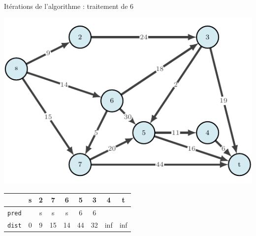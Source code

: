\begin{frame}{Itérations de l'algorithme : traitement de $6$}
    \begin{center}
        \includegraphics[height=.6\textheight]{fig/dijkstra-0.pdf}      
    \begin{tabular}{c|cccccccc}
      
        & \textbf{s}   &\textbf{2}     &7      &\textbf{6}     &5      &3      &4      &t      \\
        \hline
        \texttt{pred} & &s      &s      &s      &6      &6      &       &       \\
        \texttt{dist} & 0       &9      &15     &14     &44     &32     &inf    &inf    \\
                           \end{tabular}
\end{center}
\end{frame}


